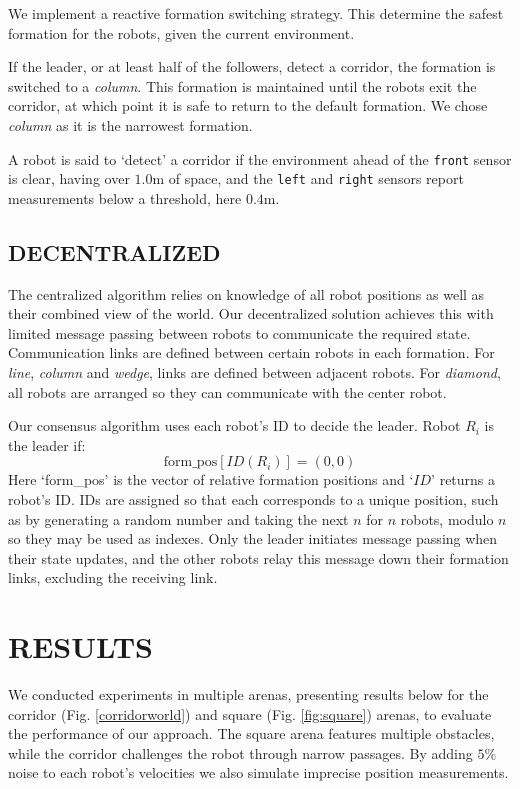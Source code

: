 \documentclass[letterpaper, 10 pt, conference]{ieeeconf}  %
\begin{document}
We implement a reactive formation switching strategy. This determine the safest formation for the robots, given the current environment.

If the leader, or at least half of the followers, detect a corridor, the formation is switched to a \textit{column}. This formation is maintained until the robots exit the corridor, at which point it is safe to return to the default formation. We chose \textit{column} as it is the narrowest formation.

A robot is said to `detect' a corridor if the environment ahead of the \texttt{front} sensor is clear, having over $1.0$m of space, and the \texttt{left} and \texttt{right} sensors report measurements below a threshold, here $0.4$m.

\subsection{DECENTRALIZED}

The centralized algorithm relies on knowledge of all robot positions as well as their combined view of the world. Our decentralized solution achieves this with limited message passing between robots to communicate the required state. Communication links are defined between certain robots in each formation. For \textit{line}, \textit{column} and \textit{wedge}, links are defined between adjacent robots. For \textit{diamond}, all robots are arranged so they can communicate with the center robot.

Our consensus algorithm uses each robot's ID to decide the leader. Robot $R_i$ is the leader if:
\[\text{form\_pos}[ID(R_i)] = (0,0)\]
Here `form\_pos' is the vector of relative formation positions and `$ID$' returns a robot's ID. IDs are assigned so that each corresponds to a unique position, such as by generating a random number and taking the next $n$ for $n$ robots, modulo $n$ so they may be used as indexes. Only the leader initiates message passing when their state updates, and the other robots relay this message down their formation links, excluding the receiving link.

\section{RESULTS}
We conducted experiments in multiple arenas, presenting results below for the corridor (Fig. \ref{corridorworld}) and square (Fig. \ref{fig:square}) arenas, to evaluate the performance of our approach. The square arena features multiple obstacles, while the corridor challenges the robot through narrow passages. By adding $5\%$ noise to each robot's velocities we also simulate imprecise position measurements.
\end{document}
